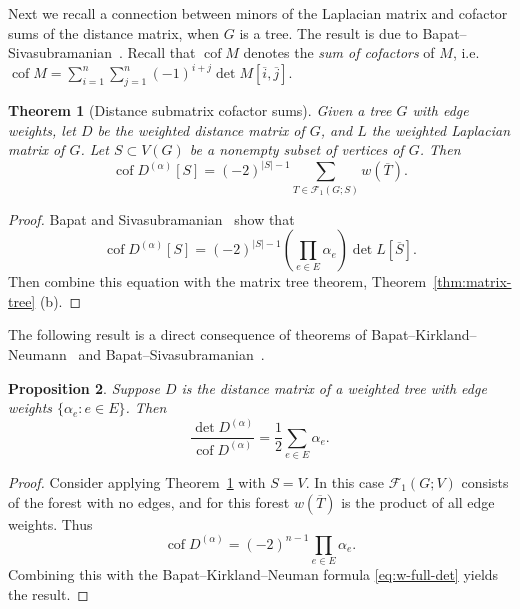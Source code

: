 \documentclass{amsart}
\newtheorem{thm}{Theorem}[section]
\newtheorem{prop}[thm]{Proposition}
\theoremstyle{definition}
\newcommand{\Da}{{D^{(\alpha)}}}
\DeclareMathOperator{\cof}{cof}
\newcommand{\trees}{\mathcal{F}_1}
\begin{document}
Next we recall a connection between minors of the Laplacian matrix and cofactor sums of the distance matrix, when $G$ is a tree.
The result is due to Bapat--Sivasubramanian~\cite{bapat-sivasubramanian}.
Recall that $\cof M$ denotes the {\em sum of cofactors} of $M$, i.e. 
$\displaystyle
	\cof M = \sum_{i = 1}^{n} \sum_{j = 1}^{n} (-1)^{i + j} \det M[\overline{i},\overline{j}].
$

\begin{thm}[Distance submatrix cofactor sums]
\label{thm:distance-sub-cof}
Given a tree $G$ with edge weights,
let $D$ be the weighted distance matrix of $G$, and $L$ the weighted Laplacian matrix of $G$.
Let $S \subset V(G)$ be a nonempty subset of vertices of $G$. 
Then
\begin{equation}
	\cof \Da[S] = (-2)^{|S|-1} \sum_{T \in \trees(G; S)} w(\overline{T}).
\end{equation}
\end{thm}
\begin{proof}
Bapat and Sivasubramanian~\cite[Theorem 11]{bapat-sivasubramanian}
show that
\[
	\cof \Da[S] = (-2)^{|S|-1} \left( \prod_{e \in E} \alpha_e \right) \det L[\overline S] .
\]
Then combine this equation with the matrix tree theorem,
Theorem~\ref{thm:matrix-tree} (b).
\end{proof}

The following result is a direct consequence of theorems of Bapat--Kirkland--Neumann~\cite{bapat-kirkland-neumann} and Bapat--Sivasubramanian~\cite{bapat-sivasubramanian}.

\begin{prop}
\label{prop:full-det-cof-ratio}
Suppose $D$ is the distance matrix of a weighted tree with edge weights $\{\alpha_e : e \in E\}$.
Then
\[
	\frac{\det \Da}{\cof \Da} = \frac1{2} \sum_{e \in E} \alpha_e .
\]
\end{prop}
\begin{proof}
Consider applying Theorem~\ref{thm:distance-sub-cof} with $S = V$.
In this case $\trees(G; V)$ consists of the forest with no edges, and for this forest $w(\overline{T})$ is the product of all edge weights.
Thus
\[
	\cof \Da = (-2)^{n - 1} \prod_{e \in E} \alpha_e .
\]
Combining this with the Bapat--Kirkland--Neuman formula \eqref{eq:w-full-det} yields the result.
\end{proof}

\end{document}
